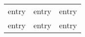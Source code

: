 \documentclass{article}
\begin{document}
\begin{tabular}{l|l|l}
    \hline
    entry & \cellcolor{blue!25} entry & entry \\
    \cellcolor{red!25} entry & entry & \cellcolor{red!25} entry \\
    \hline
\end{tabular}
\end{document}
